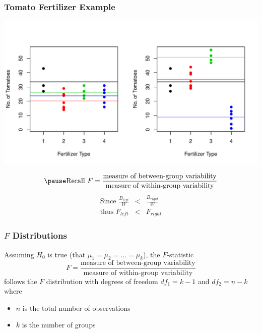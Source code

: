 \documentclass[handout]{beamer}
\newcommand{\blue}[1]{\textcolor{blue2}{#1}}
\begin{document}
\begin{frame}
\frametitle{Tomato Fertilizer Example}
\begin{center}
\includegraphics{figure/lec22-008}
\end{center}
\[
\pause \mbox{Recall }F = \frac{\mbox{measure of between-group variability}}{\mbox{measure of within-group variability}} 
\]
\pause \begin{eqnarray*}
\mbox{Since \ }\frac{B_{left}}{W} &<& \frac{B_{right}}{W}\\
\mbox{thus \ \ \  }F_{left} &<& F_{right}
\end{eqnarray*}

\end{frame}


\begin{frame}
\frametitle{$F$ Distributions}
\blue{Assuming $H_0$ is true} (that $\mu_1 = \mu_2 = \ldots = \mu_k$), the $F$-statistic
\[
F = \frac{\mbox{measure of between-group variability}}{\mbox{measure of within-group variability}}
\]
follows the \blue{$F$ distribution with degrees of freedom $df_1=k-1$ and $df_2=n-k$} where
\begin{itemize}
\pause \item $n$ is the \blue{total} number of observations
\item $k$ is the number of groups
\end{itemize}
 
\end{frame}
\end{document}
